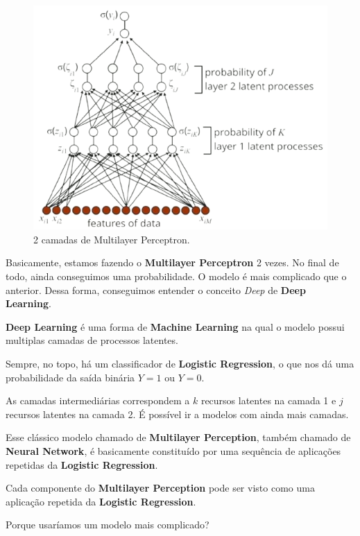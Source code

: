 \documentclass[11pt, a4paper]{article}
\begin{document}
\begin{figure}[h]
\centering
\includegraphics[scale=0.3]{7thMTP}
\caption{2 camadas de Multilayer Perceptron.}
\end{figure}

Basicamente, estamos fazendo o \textbf{Multilayer Perceptron} 2 vezes. No final de todo, ainda conseguimos uma probabilidade. O modelo é mais complicado que o anterior. Dessa forma, conseguimos entender o conceito \textit{Deep} de \textbf{Deep Learning}.

\begin{center}
\textbf{Deep Learning} é uma forma de \textbf{Machine Learning} na qual o modelo possui multiplas camadas de processos latentes.
\end{center}

Sempre, no topo, há um classificador de \textbf{Logistic Regression}, o que nos dá uma probabilidade da saída binária $Y = 1$ ou $Y = 0$.

As camadas intermediárias correspondem a $k$ recursos latentes na camada 1 e $j$ recursos latentes na camada 2. É possível ir a modelos com ainda mais camadas.

Esse clássico modelo chamado de \textbf{Multilayer Perception}, também chamado de \textbf{Neural Network}, é basicamente constituído por uma sequência de aplicações repetidas da \textbf{Logistic Regression}.
 
Cada componente do \textbf{Multilayer Perception} pode ser visto como uma aplicação repetida da \textbf{Logistic Regression}.

Porque usaríamos um modelo mais complicado?
\end{document}
